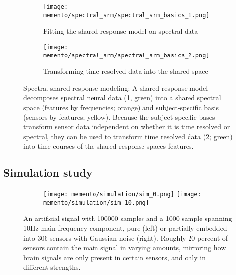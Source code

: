 \begin{figure}
	\centering
	\begin{subfigure}{0.9\textwidth}
		\texttt{[image: memento/spectral\_srm/spectral\_srm\_basics\_1.png]}
		\caption{Fitting the shared response model on spectral data}
		\label{fig:spectral-srm1}
	\end{subfigure}
	\begin{subfigure}{0.9\textwidth}
		\texttt{[image: memento/spectral\_srm/spectral\_srm\_basics\_2.png]}
		\caption{Transforming time resolved data into the shared space}
		\label{fig:spectral-srm2}
	\end{subfigure}
	\caption[Spectral shared response modeling]{Spectral shared response modeling: A shared response model decomposes spectral neural data (\ref{fig:spectral-srm1}, green) into a shared spectral space (features by frequencies; orange) and subject-specific basis (sensors by features; yellow). Because the subject specific bases transform sensor data independent on whether it is time resolved or spectral, they can be used to transform time resolved data (\ref{fig:spectral-srm2}; green) into time courses of the shared response spaces features.}
	\label{fig:spectral-srm}
\end{figure}

\subsection{Simulation study}


\begin{figure}
	\begin{subfigure}{1.0\textwidth}
		\texttt{[image: memento/simulation/sim\_0.png]}
		\texttt{[image: memento/simulation/sim\_10.png]}
	\end{subfigure}
	\caption{An artificial signal with 100000 samples and a 1000 sample spanning 10Hz main frequency component, pure (left) or partially embedded into 306 sensors with Gaussian noise (right). Roughly 20 percent of sensors contain the main signal in varying amounts, mirroring how brain signals are only present in certain sensors, and only in different strengths.}
	\label{fig:sim_artificial_signal}
\end{figure}

